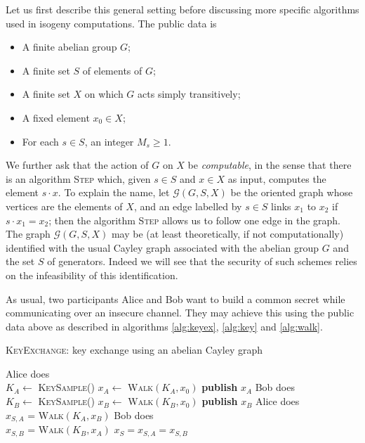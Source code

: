 \documentclass{article}
\newcommand{\Graph}{\mathcal{G}}
\newcommand{\algstyle}[1]{\textsc{#1}}
\theoremstyle{definition}
\begin{document}
Let us first describe this general
setting before discussing more specific algorithms used in isogeny computations.
The public data is
\begin{itemize}
\item A finite abelian group $G$;
\item A finite set $S$ of elements of $G$;
\item A finite set $X$ on which $G$ acts simply transitively;
\item A fixed element $x_0\in X$;
\item For each $s\in S$, an integer $M_s\geq 1$.
\end{itemize}
We further ask that the action of $G$ on $X$ be \emph{computable}, in the sense
 that there is an algorithm \algstyle{Step} which, given $s\in S$ and $x\in X$ as
input, computes the element $s\cdot x$. To explain the name, let $\Graph(G, S, X)$
be the oriented graph whose vertices are the elements of $X$, and an edge labelled
by $s\in S$ links $x_1$ to $x_2$ if $s\cdot x_1 = x_2$; then the algorithm
\algstyle{Step} allows us to follow one edge in the graph. The graph $\Graph(G, S, X)$
may be (at least theoretically, if not computationally) identified with the usual
Cayley graph associated with the abelian group $G$ and the set $S$ of generators.
Indeed we will see that the security of such schemes relies on the infeasibility
of this identification.

As usual, two participants Alice and Bob want to build a common secret while
communicating over an insecure channel. They may
achieve this using the public data above as
described in algorithms \ref{alg:keyex}, \ref{alg:key} and \ref{alg:walk}.

\begin{algorithm}
    \caption{\algstyle{KeyExchange}: key exchange using an abelian Cayley graph}
    \label{alg:keyex}
    Alice does\\
			\quad $K_A \gets$ \algstyle{KeySample}()\;
			\quad $x_A \gets$ \algstyle{Walk}$(K_A, x_0)$\;
			\quad \textbf{publish} $x_A$ \;
		Bob does\\
			\quad $K_B \gets$ \algstyle{KeySample}()\;
			\quad $x_B \gets$ \algstyle{Walk}$(K_B, x_0)$\;
			\quad \textbf{publish} $x_B$ \;
		Alice does\\
			\quad $x_{S, A}$ = \algstyle{Walk}$(K_A, x_B)$\;
		Bob does\\
			\quad $x_{S, B}$ = \algstyle{Walk}$(K_B, x_A)$\;
		\Return $x_S = x_{S, A} = x_{S, B}$
\end{algorithm}
\end{document}
